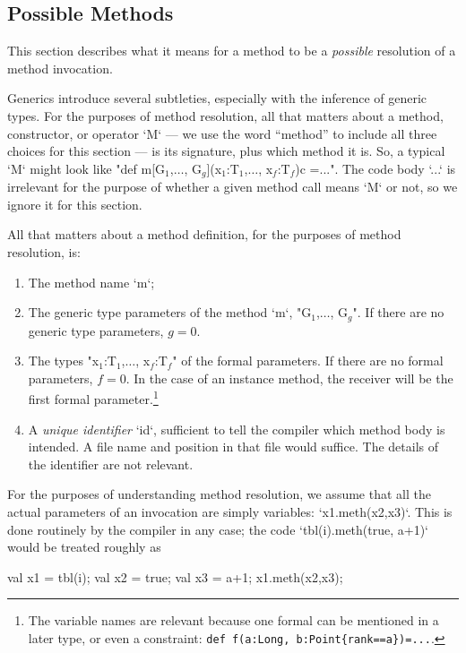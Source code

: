 \subsection{Possible Methods}

This section describes what it means for a method to be a {\em possible}
resolution of a method invocation.  



Generics introduce several subtleties, especially with the inference of
generic types. 
For the purposes of method resolution, all that matters about a method,
constructor, or operator \xcd`M` --- we use the word ``method'' to include all
three choices for this section --- is its signature, plus which method it is.
So, a typical \xcd`M` might look like 
\xcdmath"def m[G$_1$,$\ldots$, G$_g$](x$_1$:T$_1$,$\ldots$, x$_f$:T$_f$){c} =...".  The code body \xcd`...` is irrelevant for the purpose of whether a
given method call means \xcd`M` or not, so we ignore it for this section.

All that matters about a method definition, for the purposes of method
resolution, is: 
\begin{enumerate}
\item The method name \xcd`m`;
\item The generic type parameters of the method \xcd`m`,  \xcdmath"G$_1$,$\ldots$, G$_g$".  If there
      are no generic type parameters, {$g=0$}.  
\item The types \xcdmath"x$_1$:T$_1$,$\ldots$, x$_f$:T$_f$" of the formal parameters.  If
      there are no formal parameters, {$f=0$}. In the case of an instance
      method, the receiver will be the first formal parameter.\footnote{The
      variable names are relevant because one formal can be mentioned in a
      later type, or even a constraint: {\tt def f(a:Long, b:Point\{rank==a\})=...}.}
\item A {\em unique identifier} \xcd`id`, sufficient to tell the compiler
      which method body is intended.  A file name and position in that file
      would suffice.  The details of the identifier are not relevant.
\end{enumerate}

For the purposes of understanding method resolution, we assume that all the
actual parameters of an invocation are simply variables: \xcd`x1.meth(x2,x3)`.
This is done routinely by the compiler in any case; the code 
\xcd`tbl(i).meth(true, a+1)` would be treated roughly as 
\begin{xten}
val x1 = tbl(i);
val x2 = true;
val x3 = a+1;
x1.meth(x2,x3);
\end{xten}

